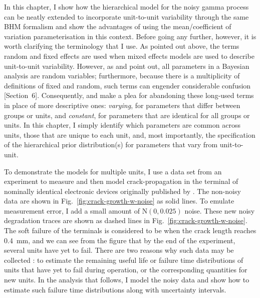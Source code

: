 In this chapter, I show how the hierarchical model for the noisy gamma process can be neatly extended to incorporate unit-to-unit variability through the same BHM formalism and show the advantages of using the mean/coefficient of variation parameterisation in this context. Before going any further, however, it is worth clarifying the terminology that I use. As pointed out above, the terms random and fixed effects are used when mixed effects models are used to describe unit-to-unit variability. However, as \citet{Gelman2005} and \citet{gelman2006} point out, all parameters in a Bayesian analysis are random variables; furthermore, because there is a multiplicity of definitions of fixed and random, such terms can engender considerable confusion [Section~6]\citep{Gelman2005}. Consequently, \citet{Gelman2005} and \citet{gelman2006} make a plea for abandoning these long-used terms in place of more descriptive ones: \emph{varying}, for parameters that differ between groups or units, and \emph{constant}, for parameters that are identical for all groups or units. In this chapter, I simply identify which parameters are common across units, those that are unique to each unit, and, most importantly, the specification of the hierarchical prior distribution(s) for parameters that vary from unit-to-unit.

To demonstrate the models for multiple units, I use a data set from an experiment to measure and then model crack-propagation in the terminal of nominally identical electronic devices originally published by \citet{rodriguez-picon2018}. The non-noisy data are shown in Fig.~\ref{fig:crack-growth-w-noise} as solid lines. To emulate measurement error, I add a small amount of $\mathrm{N}(0, 0.025)$ noise. These new noisy degradation traces are shown as dashed lines in Fig.~\ref{fig:crack-growth-w-noise}. The soft failure of the terminals is considered to be when the crack length reaches 0.4~mm, and we can see from the figure that by the end of the experiment, several units have yet to fail. There are two reasons why such data may be collected \citep{robinson2000}: to estimate the remaining useful life or failure time distributions of units that have yet to fail during operation, or the corresponding quantities for new units. In the analysis that follows, I model the noisy data and show how to estimate such failure time distributions along with uncertainty intervals.

